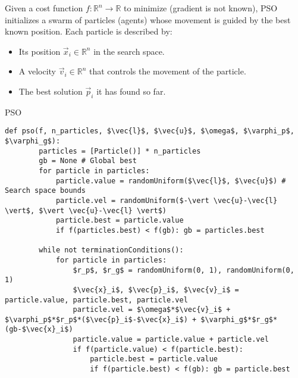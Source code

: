 Given a cost function $f: \mathbb{R}^n \rightarrow \mathbb{R}$ to minimize (gradient is not known),
PSO initializes a swarm of particles (agents) whose movement is guided by the best known position.
Each particle is described by:
\begin{itemize}
    \item Its position $\vec{x}_i \in \mathbb{R}^n$ in the search space.
    \item A velocity $\vec{v}_i \in \mathbb{R}^n$ that controls the movement of the particle.
    \item The best solution $\vec{p}_i$ it has found so far.
\end{itemize}

\begin{algorithm}
\caption{PSO}
\begin{lstlisting}[mathescape=true]
    def pso(f, n_particles, $\vec{l}$, $\vec{u}$, $\omega$, $\varphi_p$, $\varphi_g$):
        particles = [Particle()] * n_particles
        gb = None # Global best
        for particle in particles:
            particle.value = randomUniform($\vec{l}$, $\vec{u}$) # Search space bounds
            particle.vel = randomUniform($-\vert \vec{u}-\vec{l} \vert$, $\vert \vec{u}-\vec{l} \vert$)
            particle.best = particle.value
            if f(particles.best) < f(gb): gb = particles.best

        while not terminationConditions():
            for particle in particles:
                $r_p$, $r_g$ = randomUniform(0, 1), randomUniform(0, 1)
                $\vec{x}_i$, $\vec{p}_i$, $\vec{v}_i$ = particle.value, particle.best, particle.vel
                particle.vel = $\omega$*$\vec{v}_i$ + $\varphi_p$*$r_p$*($\vec{p}_i$-$\vec{x}_i$) + $\varphi_g$*$r_g$*(gb-$\vec{x}_i$)
                particle.value = particle.value + particle.vel
                if f(particle.value) < f(particle.best):
                    particle.best = particle.value
                    if f(particle.best) < f(gb): gb = particle.best
\end{lstlisting}
\end{algorithm}

